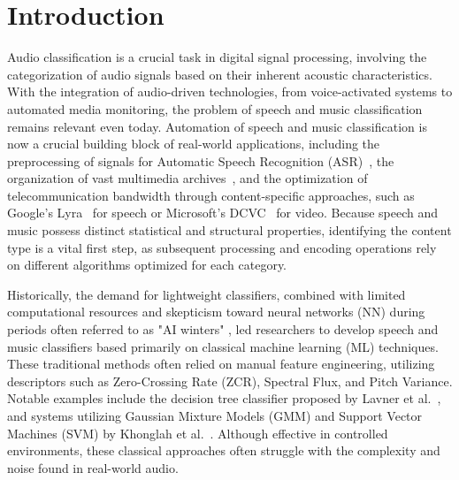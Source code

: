 
% 


\chapter{Introduction}
Audio classification is a crucial task in digital signal processing, involving the categorization of audio signals based on their inherent acoustic characteristics.
With the integration of audio-driven technologies, from voice-activated systems to automated media monitoring, the problem of speech and music classification remains relevant even today.
Automation of speech and music classification is now a crucial building block of real-world applications, including the preprocessing of signals for Automatic Speech Recognition (ASR)~\cite{BENZEGHIBA2007763}, the organization of vast multimedia archives~\cite{samouelian1998speech}, and the optimization of telecommunication bandwidth through content-specific approaches, such as Google's Lyra~\cite{ren2024fewertokenneuralspeechcodec} for speech or Microsoft's DCVC~\cite{jia2025practicalrealtimeneuralvideo} for video.
Because speech and music possess distinct statistical and structural properties, identifying the content type is a vital first step, as subsequent processing and encoding operations rely on different algorithms optimized for each category.

Historically, the demand for lightweight classifiers, combined with limited computational resources and skepticism toward neural networks (NN) during periods often referred to as "AI winters" \cite{CognitechSystems2024}, led researchers to develop speech and music classifiers based primarily on classical machine learning (ML) techniques. 
These traditional methods often relied on manual feature engineering, utilizing descriptors such as Zero-Crossing Rate (ZCR), Spectral Flux, and Pitch Variance. 
Notable examples include the decision tree classifier proposed by Lavner et al.~\cite{Lavner2009-zo}, and systems utilizing Gaussian Mixture Models (GMM) and Support Vector Machines (SVM) by Khonglah et al.~\cite{KHONGLAH201671}. 
Although effective in controlled environments, these classical approaches often struggle with the complexity and noise found in real-world audio.

